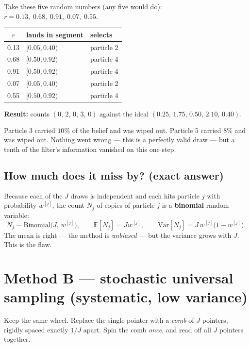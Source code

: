 \documentclass[11pt,a4paper]{report}
\newcommand{\term}[1]{\textcolor{rust}{\textbf{#1}}}
\begin{document}
\begin{handbox}
Take these five random numbers (any five would do):
$r = 0.13,\; 0.68,\; 0.91,\; 0.07,\; 0.55$.

\begin{center}
\begin{tabular}{@{}cll@{}}
\toprule
$r$ & lands in segment & selects \\
\midrule
0.13 & $[0.05, 0.40)$ & particle 2 \\
0.68 & $[0.50, 0.92)$ & particle 4 \\
0.91 & $[0.50, 0.92)$ & particle 4 \\
0.07 & $[0.05, 0.40)$ & particle 2 \\
0.55 & $[0.50, 0.92)$ & particle 4 \\
\bottomrule
\end{tabular}
\end{center}

\textbf{Result:} counts $(0,\,2,\,0,\,3,\,0)$ against the ideal
$(0.25,\,1.75,\,0.50,\,2.10,\,0.40)$.

Particle 3 carried $10\%$ of the belief and was wiped out. Particle 5 carried
$8\%$ and was wiped out. Nothing went wrong --- this is a perfectly valid draw
--- but a tenth of the filter's information vanished on this one step.
\end{handbox}

\subsection{How much does it miss by? (exact answer)}

Because each of the $J$ draws is independent and each hits particle $j$ with
probability $w^{[j]}$, the count $N_j$ of copies of particle $j$ is a
\term{binomial} random variable:
\begin{equation}
N_j \sim \mathrm{Binomial}\bigl(J,\, w^{[j]}\bigr), \qquad
\mathbb{E}[N_j] = J w^{[j]}, \qquad
\mathrm{Var}[N_j] = J\, w^{[j]}\bigl(1 - w^{[j]}\bigr).
\label{eq:multivar}
\end{equation}
The mean is right --- the method is \emph{unbiased} --- but the variance grows
with $J$. This is the flaw.

\section{Method B --- stochastic universal sampling (systematic, low variance)}

Keep the same wheel. Replace the single pointer with a \emph{comb} of $J$
pointers, rigidly spaced exactly $1/J$ apart. Spin the comb \emph{once}, and
read off all $J$ pointers together.
\end{document}
